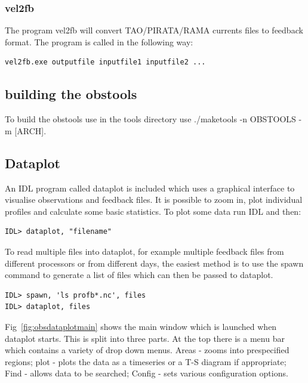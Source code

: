 \subsubsection{vel2fb}

The program vel2fb will convert TAO/PIRATA/RAMA currents files to feedback format. The program
is called in the following way:

\begin{alltt}
\footnotesize
\begin{verbatim}
vel2fb.exe outputfile inputfile1 inputfile2 ...
\end{verbatim}
\end{alltt}

\subsection{building the obstools}

To build the obstools use in the tools directory use ./maketools -n OBSTOOLS -m [ARCH].

\subsection{Dataplot}

An IDL program called dataplot is included which uses a graphical interface to visualise
observations and feedback files. It is possible to zoom in, plot individual profiles and
calculate some basic statistics. To plot some data run IDL and then:
\begin{alltt}
\footnotesize
\begin{verbatim}
IDL> dataplot, "filename"
\end{verbatim}
\end{alltt}

To read multiple files into dataplot, for example multiple feedback files from different
processors or from different days, the easiest method is to use the spawn command to generate
a list of files which can then be passed to dataplot.
\begin{alltt}
\footnotesize
\begin{verbatim}
IDL> spawn, 'ls profb*.nc', files
IDL> dataplot, files
\end{verbatim}
\end{alltt}

Fig~\ref{fig:obsdataplotmain} shows the main window which is launched when dataplot starts.
This is split into three parts. At the top there is a menu bar which contains a variety of
drop down menus. Areas - zooms into prespecified regions; plot - plots the data as a
timeseries or a T-S diagram if appropriate; Find - allows data to be searched; Config - sets
various configuration options.

